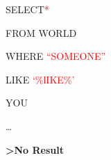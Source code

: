 \begingroup
\thispagestyle{empty}
\vspace*{5cm}
\par\normalfont\fontsize{35}{35}\sffamily\selectfont
SELECT\textcolor{red}{*}

FROM WORLD

WHERE \textcolor{red}{``SOMEONE''}

LIKE \textcolor{red}{`\%lIKE\%'}

YOU

\dots

\textbf{\textfractionsolidus{}\textgreater{}No Result}
\endgroup